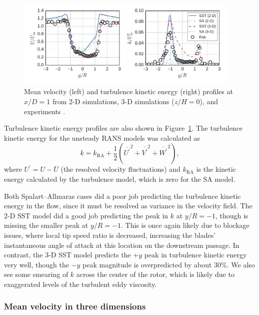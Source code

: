 \documentclass[aip,graphicx]{revtex4-1}
\begin{document}
\begin{figure}
    \centering

    \includegraphics[width=0.95\textwidth]{profiles}

    \caption{Mean velocity (left) and turbulence kinetic energy (right) profiles
        at $x/D=1$ from 2-D simulations, 3-D simulations ($z/H=0$), and experiments
        \cite{Bachant2015-JoT}.}

    \label{fig:br-cfd-profiles}
\end{figure}

Turbulence kinetic energy profiles are also shown in
Figure~\ref{fig:br-cfd-profiles}. The turbulence kinetic energy for the unsteady
RANS models was calculated as
\begin{equation}
    k = k_{\mathrm{RA}} + \frac{1}{2} \left(
    \overline{U^\prime}^2 +
    \overline{V^\prime}^2 +
    \overline{W^\prime}^2 \right),
    \label{eq:k}
\end{equation}
where $U^\prime = U - \overline{U}$ (the resolved velocity fluctuations) and
$k_{\mathrm{RA}}$ is the kinetic energy calculated by the turbulence model,
which is zero for the SA model.

Both Spalart--Allmaras cases did a poor job predicting the turbulence kinetic
energy in the flow, since it must be resolved as variance in the velocity field.
The 2-D SST model did a good job predicting the peak in $k$ at $y/R=-1$, though
is missing the smaller peak at $y/R=-1$. This is once again likely due to
blockage issues, where local tip speed ratio is decreased, increasing the
blades' instantaneous angle of attack at this location on the downstream
passage. In contrast, the 3-D SST model predicts the $+y$ peak in turbulence
kinetic energy very well, though the $-y$ peak magnitude is overpredicted by
about 30\%. We also see some smearing of $k$ across the center of the rotor,
which is likely due to exaggerated levels of the turbulent eddy viscosity.


\subsubsection{Mean velocity in three dimensions}
\end{document}
